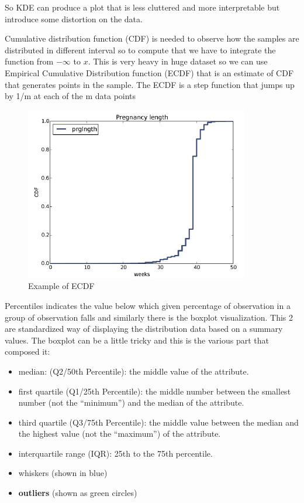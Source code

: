 So KDE can produce a plot that is less cluttered and more interpretable but introduce some distortion on the data.

Cumulative distribution function (CDF) is needed to observe how the samples are distributed in different interval so to compute that we have to integrate the function from $ - \infty$ to $x$. This is very heavy in huge dataset so we can use Empirical Cumulative Distribution function (ECDF) that is an estimate of CDF that generates points in the sample. The ECDF is a step function that jumps up by 1/m at each of the m data points

\begin{figure}[H]
    \centering
    \includegraphics{images/DataExplVis/ECDF.png}
    \caption{Example of ECDF}
    \label{fig:enter-label}
\end{figure}

Percentiles indicates the value below which given percentage of observation in a group of observation falls and similarly there is the boxplot visualization. This 2 are standardized way of displaying the distribution data based on a summary values.
The boxplot can be a little tricky and this is the various part that composed it:
\begin{itemize}
    \item median: (Q2/50th Percentile): the middle value of the attribute.
    \item first quartile (Q1/25th Percentile): the middle number between the smallest number (not the “minimum”) and the median of the attribute.
    \item third quartile (Q3/75th Percentile): the middle value between the median and the highest value (not the “maximum”) of the attribute.
    \item interquartile range (IQR): 25th to the 75th percentile.
    \item whiskers (shown in blue)
    \item \textbf{outliers} (shown as green circles)
\end{itemize}

